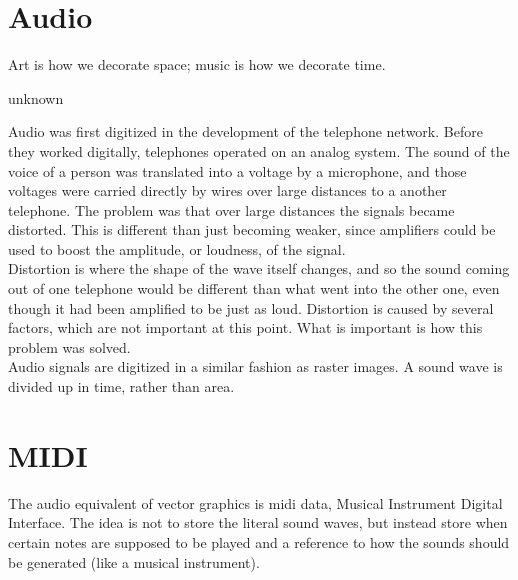 \section{Audio}

\epigraph{Art is how we decorate space; music is how we decorate time.}{unknown}

Audio was first digitized in the development of the telephone network. Before they worked digitally, telephones operated on an analog system. The sound of the voice of a person was translated into a voltage by a microphone, and those voltages were carried directly by wires over large distances to a another telephone. The problem was that over large distances the signals became distorted. This is different than just becoming weaker, since amplifiers could be used to boost the amplitude, or loudness, of the signal.\\

Distortion is where the shape of the wave itself changes, and so the sound coming out of one telephone would be different than what went into the other one, even though it had been amplified to be just as loud. Distortion is caused by several factors, which are not important at this point. What is important is how this problem was solved.\\

Audio signals are digitized in a similar fashion as raster images. A sound wave is divided up in time, rather than area.

\section{MIDI}

The audio equivalent of vector graphics is midi data, Musical Instrument Digital Interface. The idea is not to store the literal sound waves, but instead store when certain notes are supposed to be played and a reference to how the sounds should be generated (like a musical instrument).




